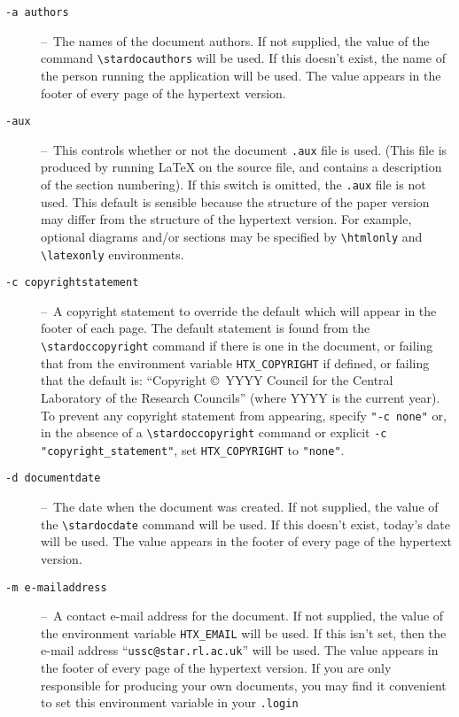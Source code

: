 \documentclass[twoside,11pt]{article}
\newcommand{\stardoccopyright} 
{Copyright \copyright\ 2000 Council for the Central Laboratory of the Research Councils}
\newcommand{\stardocauthors}   {P W Draper\\
                                A J Chipperfield\\
                                M D Lawden}
\newcommand{\stardocdate}      {2 February 2000}
\renewcommand{\_}{\texttt{\symbol{95}}}
\newcommand{\dash}{--}
\newcommand{\dash}{-}
\begin{document}
\begin{description}
\item[\texttt{-a authors}] \dash\
   The names of the document authors.
   If not supplied, the value of the command \verb#\stardocauthors# will be
   used.
   If this doesn't exist, the name of the person running the application will
   be used.
   The value appears in the footer of every page of the hypertext version.
\item[\texttt{-aux}] \dash\
   This controls whether or not the document \texttt{.aux} file is used.
   (This file is produced by running LaTeX on the source file, and contains a
   description of the section numbering).
   If this switch is omitted, the \texttt{.aux} file is not used.
   This default is sensible because the structure of the paper version
   may differ from the structure of the hypertext version.
   For example, optional diagrams and/or sections may be specified by
   \verb+\htmlonly+ and \verb+\latexonly+ environments.
\item[\texttt{-c copyright\_statement}] \dash\
   A copyright statement to override the default which will appear
   in the footer of each page. The default statement is found from
   the \verb#\stardoccopyright# command if there is one in the document, or 
   failing that from the environment variable \verb#HTX_COPYRIGHT# if defined,
   or failing that the default is: ``Copyright \copyright\ YYYY Council for
   the Central Laboratory of the Research Councils'' (where YYYY is the
   current year).
   To prevent any copyright statement from appearing, specify \verb#"-c none"#
   or, in the absence of a \verb#\stardoccopyright# command or explicit
   \verb#-c "copyright_statement"#, set  \verb#HTX_COPYRIGHT# to \verb#"none"#.
\item[\texttt{-d document\_date}] \dash\
   The date when the document was created.
   If not supplied, the value of the \verb#\stardocdate# command will be used.
   If this doesn't exist, today's date will be used.
   The value appears in the footer of every page of the hypertext version.
\item[\texttt{-m e-mail\_address}] \dash\
   A contact e-mail address for the document.
   If not supplied, the value of the environment variable
   \verb#HTX_EMAIL# will be used.
   If this isn't set, then the e-mail address
   ``\texttt{ussc@star.rl.ac.uk}'' will be used.
   The value appears in the footer of every page of the hypertext version.
   If you are only responsible for producing your own documents, you may find
   it convenient to set this environment variable in your \texttt{.login}

\end{description}
\end{document}
